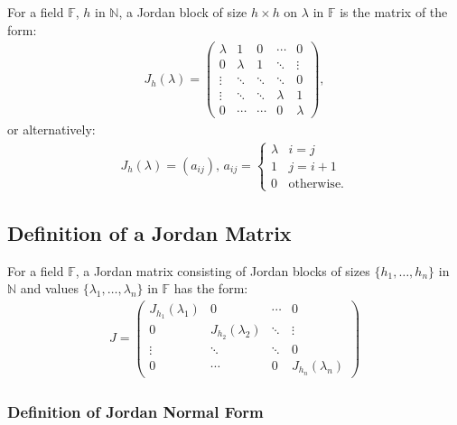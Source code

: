 \documentclass[a4paper, 12pt, twoside]{article}
\begin{document}
For a field $\mathbb{F}$, $h$ in $\mathbb{N}$, a Jordan block of size $h \times h$
on $\lambda$ in $\mathbb{F}$ is the matrix of the form: \begin{gather*}
  J_h(\lambda) = \begin{pmatrix}
    \lambda & 1       & 0      & \cdots  & 0       \\
    0       & \lambda & 1      & \ddots  & \vdots  \\
    \vdots  & \ddots  & \ddots & \ddots  & 0       \\
    \vdots  & \ddots  & \ddots & \lambda & 1       \\
    0       & \cdots  & \cdots & 0       & \lambda
  \end{pmatrix},
\end{gather*} or alternatively: \begin{gather*}
  J_h(\lambda) = (a_{ij}), \, a_{ij} = \begin{cases}
    \lambda & i = j \\
    1       & j = i + 1 \\
    0       & \text{otherwise.}
  \end{cases}
\end{gather*}

\subsection{Definition of a Jordan Matrix}

For a field $\mathbb{F}$, a Jordan matrix consisting of Jordan blocks of sizes 
$\{h_1, \ldots, h_n\}$ in $\mathbb{N}$ and values 
$\{\lambda_1, \ldots, \lambda_n\}$ in $\mathbb{F}$ has the form: \begin{gather*}
  J = \begin{pmatrix}
    J_{h_1}(\lambda_1) & 0                  & \cdots & 0      \\
    0                  & J_{h_2}(\lambda_2) & \ddots & \vdots \\
    \vdots             & \ddots             & \ddots & 0      \\
    0                  & \cdots             & 0      & J_{h_n}(\lambda_n)
  \end{pmatrix}
\end{gather*}

\subsubsection{Definition of Jordan Normal Form}
\end{document}
